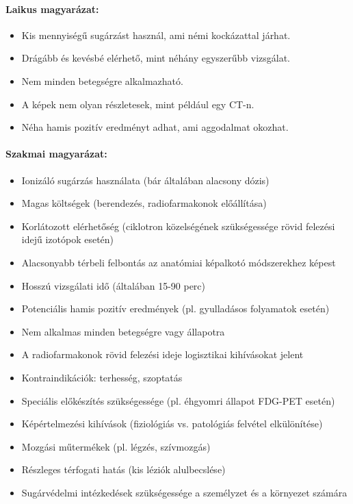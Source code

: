 \documentclass[a4paper,12pt]{article}
\begin{document}
\paragraph{Laikus magyarázat:} \begin{itemize} \item Kis mennyiségű sugárzást használ, ami némi kockázattal járhat. \item Drágább és kevésbé elérhető, mint néhány egyszerűbb vizsgálat. \item Nem minden betegségre alkalmazható. \item A képek nem olyan részletesek, mint például egy CT-n. \item Néha hamis pozitív eredményt adhat, ami aggodalmat okozhat. \end{itemize}

\paragraph{Szakmai magyarázat:} \begin{itemize} \item Ionizáló sugárzás használata (bár általában alacsony dózis) \item Magas költségek (berendezés, radiofarmakonok előállítása) \item Korlátozott elérhetőség (ciklotron közelségének szükségessége rövid felezési idejű izotópok esetén) \item Alacsonyabb térbeli felbontás az anatómiai képalkotó módszerekhez képest \item Hosszú vizsgálati idő (általában 15-90 perc) \item Potenciális hamis pozitív eredmények (pl. gyulladásos folyamatok esetén) \item Nem alkalmas minden betegségre vagy állapotra \item A radiofarmakonok rövid felezési ideje logisztikai kihívásokat jelent \item Kontraindikációk: terhesség, szoptatás \item Speciális előkészítés szükségessége (pl. éhgyomri állapot FDG-PET esetén) \item Képértelmezési kihívások (fiziológiás vs. patológiás felvétel elkülönítése) \item Mozgási műtermékek (pl. légzés, szívmozgás) \item Részleges térfogati hatás (kis léziók alulbecslése) \item Sugárvédelmi intézkedések szükségessége a személyzet és a környezet számára \end{itemize}
\end{document}
